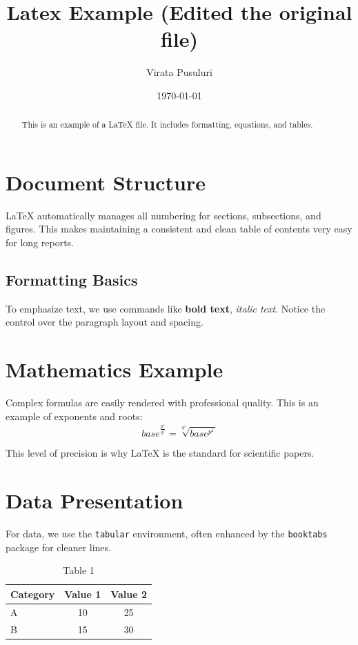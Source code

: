 \documentclass[11pt, a4paper]{article}
\title{\textbf{Latex Example (Edited the original file)}}
\author{Virata Pusuluri}
\date{\today}
\begin{document}
\maketitle

\begin{abstract}
This is an example of a LaTeX file. It includes formatting, equations, and tables.
\end{abstract}

\section{Document Structure}
LaTeX automatically manages all numbering for sections, subsections, and figures. This makes maintaining a consistent and clean table of contents very easy for long reports.
\subsection{Formatting Basics}
To emphasize text, we use commands like \textbf{bold text}, \textit{italic text}. Notice the control over the paragraph layout and spacing.
%
\section{Mathematics Example}
Complex formulas are easily rendered with professional quality. This is an example of exponents and roots:  $$base^{\frac{p^1}{q^1}} = \sqrt[q^1]{base^{p^1}}$$

This level of precision is why LaTeX is the standard for scientific papers.

\section{Data Presentation}
For data, we use the \texttt{tabular} environment, often enhanced by the \texttt{booktabs} package for cleaner lines.

\begin{table}[htbp]
    \centering
    \caption{Table 1}
    \label{tab:data}
    \begin{tabular}{lcc}
        \toprule
        Category & Value 1 & Value 2 \\
        \midrule
        A & 10 & 25 \\
        B & 15 & 30 \\
        \bottomrule
    \end{tabular}
\end{table}
\end{document}
